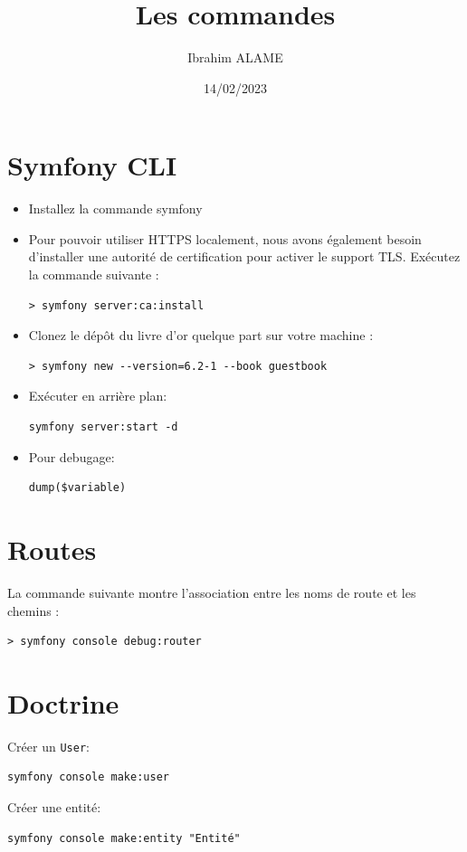 \documentclass{article}
\title{Les commandes}
\author{Ibrahim ALAME}
\date{14/02/2023}
\begin{document}
\maketitle
\section{Symfony CLI}
\begin{itemize}
\item Installez la commande symfony
\item Pour pouvoir utiliser HTTPS localement, nous avons également besoin
d’installer une autorité de certification pour activer le support TLS.
Exécutez la commande suivante :
\begin{verbatim}
> symfony server:ca:install
\end{verbatim}
\item Clonez le dépôt du livre d'or quelque part sur votre machine :
\begin{verbatim}
> symfony new --version=6.2-1 --book guestbook
\end{verbatim}
\item Exécuter en arrière plan:
\begin{verbatim}
symfony server:start -d
\end{verbatim}
\item Pour debugage:
\begin{verbatim}
dump($variable)
\end{verbatim}

\end{itemize}

\section{Routes}
La commande suivante  montre l'association
entre les noms de route et les chemins :
\begin{verbatim}
> symfony console debug:router
\end{verbatim}
\section{Doctrine}
Créer un {\tt User}:
\begin{verbatim}
symfony console make:user
\end{verbatim}
Créer une entité:
\begin{verbatim}
symfony console make:entity "Entité"
\end{verbatim}
\end{document}
